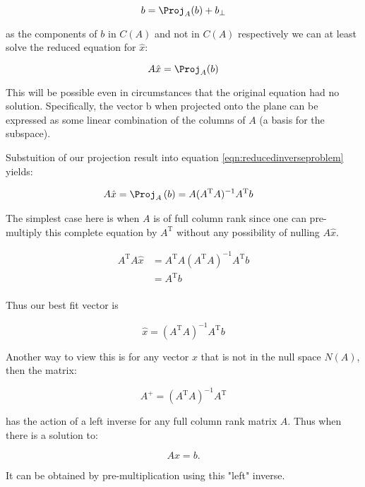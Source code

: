 \documentclass{article}      %
\newcommand{\T}[0]{\text{T}}
\begin{document}
\[
b = \Proj_A(b) + b_\perp
\]

as the components of $b$ in $C(A)$ and not in $C(A)$ respectively we can at least solve the reduced equation for $\hat{x}$:


\begin{equation}\label{eqn:reducedinverseproblem}
A \hat{x} = \Proj_A(b)
\end{equation}


This will be possible even in circumstances that the original equation had no solution.  Specifically, the vector b when projected onto the plane can be expressed as some
linear combination of the columns of $A$ (a basis for the subspace).

Substuition of our projection result into equation \ref{eqn:reducedinverseproblem} yields:

\begin{align*}
A \hat{x} 
&= \Proj_{A}\left(b\right) = A (A^\T A)^{-1} A^\T b
\end{align*}

The simplest case here is when $A$ is of full column rank since one can pre-multiply this complete equation by $A^\T$ without any possibility of nulling
$A \hat{x}$.

\begin{align*}
A^\T A \hat{x} 
&= A^\T A (A^\T A)^{-1} A^\T b \\
&= A^\T b \\
\end{align*}

Thus our best fit vector is

\begin{equation}
\hat{x} 
= (A^\T A)^{-1} A^\T b
\end{equation}

Another way to view this is for any vector $x$ that is not in the null space $N(A)$, then the matrix:

\begin{equation}
A^{+}= (A^\T A)^{-1} A^\T
\end{equation}

has the action of a left inverse for any full column rank matrix $A$.  Thus when there is a solution to:

\begin{equation}
A x = b.
\end{equation}

It can be obtained by pre-multiplication using this "left" inverse.
\end{document}
